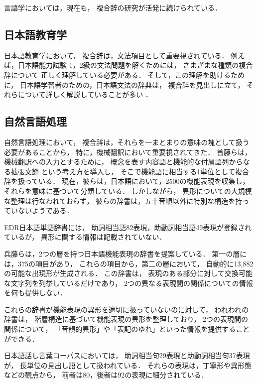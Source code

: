 \documentclass[japanese]{jnlp_1.3e}
\begin{document}
言語学においては，現在も，
複合辞の研究が活発に続けられている．

\subsection{日本語教育学}

日本語教育学において，
複合辞は，文法項目として重要視されている．
例えば，日本語能力試験 1，2級の文法問題を解くためには，
さまざまな種類の複合辞について
正しく理解している必要がある．
そして，この理解を助けるために，
日本語学習者のための，日本語文法の辞典は，
複合辞を見出しに立て，
それらについて詳しく解説していることが多い
．

\subsection{自然言語処理}

自然言語処理において，
複合辞は，それらを一まとまりの意味の塊として扱う必要があることから，
特に，機械翻訳において重要視されてきた．
首藤らは，
機械翻訳への入力とするために，
概念を表す内容語と機能的な付属語列からなる拡張文節
という考え方を導入し，
そこで機能語に相当する1単位として複合辞を扱っている．
現在，彼らは，日本語において，2500の機能表現を収集し，
それらを意味に基づいて分類している．
しかしながら，
異形についての大規模な整理は行なわれておらず，
彼らの辞書は，五十音順以外に特別な構造を持っていないようである．

EDR日本語単語辞書には，
助詞相当語82表現，助動詞相当語49表現が登録されているが，
異形に関する情報は記載されていない．

兵藤らは，2つの層を持つ日本語機能表現の辞書を提案している．
第一の層には，375の項目があり，
これらの項目から，第二の層において，
自動的に13,882の可能な出現形が生成される．
この辞書は，
表現のある部分に対して交換可能な文字列を列挙しているだけであり，
2つの異なる表現間の関係についての情報を何も提供しない．

これらの辞書が機能表現の異形を適切に扱っていないのに対して，
われわれの辞書は，
階層構造に基づいて機能表現の異形を整理しており，
2つの表現間の関係について，
「音韻的異形」や「表記のゆれ」といった情報を提供することができる．

日本語話し言葉コーパスにおいては，
助詞相当句29表現と助動詞相当句37表現が，
長単位の見出し語として扱われている．
それらの表現は，丁寧形や異形態などの観点から，
前者は80，後者は92の表現に細分されている．
\end{document}
